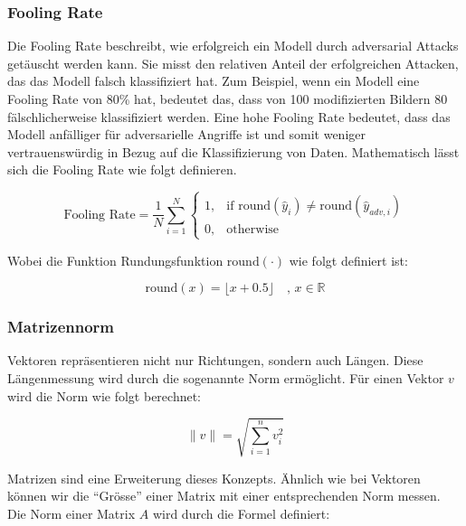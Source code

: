 \subsubsection{Fooling Rate}
Die Fooling Rate beschreibt, wie erfolgreich ein Modell durch adversarial Attacks getäuscht werden kann. Sie misst den relativen Anteil der erfolgreichen Attacken, das das Modell falsch klassifiziert hat. Zum Beispiel, wenn ein Modell eine Fooling Rate von 80\% hat, bedeutet das, dass von 100 modifizierten Bildern 80 fälschlicherweise klassifiziert werden. Eine hohe Fooling Rate bedeutet, dass das Modell anfälliger für adversarielle Angriffe ist und somit weniger vertrauenswürdig in Bezug auf die Klassifizierung von Daten. Mathematisch lässt sich die Fooling Rate wie folgt definieren. 

\begin{equation}
    \text{Fooling Rate} = \frac{1}{N} \sum_{i=1}^{N} \left\{ \begin{array}{ll} 1, & \text{if } \text{round}(\hat{y}_i) \neq \text{round}(\hat{y}_{adv,i}) \\ 0, & \text{otherwise} \end{array} \right.
    \label{eq:Fooling Rate}
\end{equation}

Wobei die Funktion Rundungsfunktion $\text{round}(\cdot)$ wie folgt definiert ist:


\begin{equation}
    \text{round}(x) = \lfloor x + 0.5 \rfloor \quad \text{, } x \in \mathbb{R}
    \label{eq:Rundungsfunktion}
\end{equation}


\subsubsection{Matrizennorm}
Vektoren repräsentieren nicht nur Richtungen, sondern auch Längen. Diese Längenmessung wird durch die sogenannte Norm ermöglicht. Für einen Vektor $v$ wird die Norm wie folgt berechnet:

\begin{equation}
    \| v \| = \sqrt{\sum_{i=1}^{n} v_i^2}
    \label{eq:Vektornorm}
\end{equation}

Matrizen sind eine Erweiterung dieses Konzepts. Ähnlich wie bei Vektoren können wir die "`Grösse"' einer Matrix mit einer entsprechenden Norm messen. Die Norm einer Matrix $A$ wird durch die Formel definiert:

